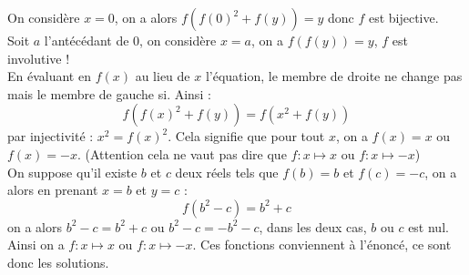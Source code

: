 \begin{sol}[][6]
On considère $x=0$, on a alors $f(f(0)^2+f(y))=y$ donc $f$ est bijective.\\
Soit $a$ l'antécédant de $0$, on considère $x=a$, on a $f(f(y))=y$, $f$ est involutive !\\
En évaluant en $f(x)$ au lieu de $x$ l'équation, le membre de droite ne change pas mais le membre de gauche si. Ainsi : $$f(f(x)^2+f(y))=f(x^2+f(y))$$ par injectivité : $x^2=f(x)^2$. Cela signifie que pour tout $x$, on a $f(x)=x$ ou $f(x)=-x$. (Attention cela ne vaut pas dire que $f:x\longmapsto x$ ou $f:x\longmapsto -x$)\\
On suppose qu'il existe $b$ et $c$ deux réels tels que $f(b)=b$ et $f(c)=-c$, on a alors en prenant $x=b$ et $y=c$ : $$f(b^2-c)=b^2+c$$ on a alors $b^2-c=b^2+c$ ou $b^2-c=-b^2-c$, dans les deux cas, $b$ ou $c$ est nul. Ainsi on a $f:x\longmapsto x$ ou $f:x\longmapsto -x$. Ces fonctions conviennent à l'énoncé, ce sont donc les solutions.

\end{sol}

